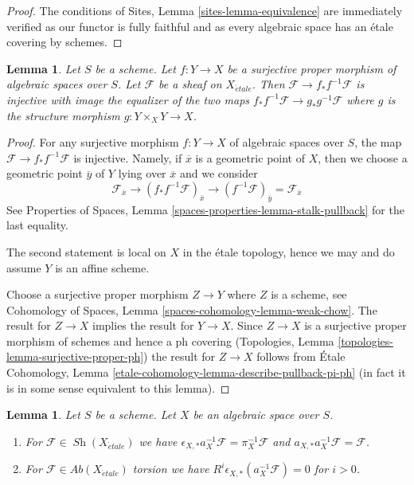 \documentclass{stacks-project}
\theoremstyle{plain}
\newtheorem{lemma}[subsection]{Lemma}
\theoremstyle{definition}
\theoremstyle{remark}
\numberwithin{equation}{subsection}
\def\Sh{\mathop{\mathit{Sh}}\nolimits}
\def\etale{{\acute{e}tale}}
\begin{document}
\begin{proof}
The conditions of Sites, Lemma \ref{sites-lemma-equivalence}
are immediately verified as our functor is fully faithful
and as every algebraic space has an \'etale covering by schemes.
\end{proof}

\begin{lemma}
\label{lemma-surjective-proper}
Let $S$ be a scheme. Let $f : Y \to X$ be a surjective proper morphism
of algebraic spaces over $S$. Let $\mathcal{F}$ be a sheaf on $X_\etale$.
Then $\mathcal{F} \to f_*f^{-1}\mathcal{F}$ is injective with
image the equalizer of the two maps
$f_*f^{-1}\mathcal{F} \to g_*g^{-1}\mathcal{F}$ where
$g$ is the structure morphism $g : Y \times_X Y \to X$.
\end{lemma}

\begin{proof}
For any surjective morphism $f : Y \to X$ of algebraic spaces over $S$,
the map $\mathcal{F} \to f_*f^{-1}\mathcal{F}$ is injective.
Namely, if $\overline{x}$ is a geometric point of $X$, then we
choose a geometric point $\overline{y}$ of $Y$ lying over $\overline{x}$
and we consider
$$
\mathcal{F}_{\overline{x}} \to
(f_*f^{-1}\mathcal{F})_{\overline{x}} \to
(f^{-1}\mathcal{F})_{\overline{y}} = \mathcal{F}_{\overline{x}}
$$
See Properties of Spaces, Lemma \ref{spaces-properties-lemma-stalk-pullback}
for the last equality.

\medskip\noindent
The second statement is local on $X$ in the \'etale topology, hence we may
and do assume $Y$ is an affine scheme.

\medskip\noindent
Choose a surjective proper morphism $Z \to Y$ where $Z$ is a scheme, see
Cohomology of Spaces, Lemma \ref{spaces-cohomology-lemma-weak-chow}.
The result for $Z \to X$ implies the result for $Y \to X$.
Since $Z \to X$ is a surjective proper morphism of schemes
and hence a ph covering
(Topologies, Lemma \ref{topologies-lemma-surjective-proper-ph})
the result for $Z \to X$ follows from
\'Etale Cohomology, Lemma \ref{etale-cohomology-lemma-describe-pullback-pi-ph}
(in fact it is in some sense equivalent to this lemma).
\end{proof}

\begin{lemma}
\label{lemma-comparison-ph-etale}
Let $S$ be a scheme. Let $X$ be an algebraic space over $S$.
\begin{enumerate}
\item For $\mathcal{F} \in \Sh(X_\etale)$ we have
$\epsilon_{X, *}a_X^{-1}\mathcal{F} = \pi_X^{-1}\mathcal{F}$
and $a_{X, *}a_X^{-1}\mathcal{F} = \mathcal{F}$.
\item For $\mathcal{F} \in \textit{Ab}(X_\etale)$ torsion we have
$R^i\epsilon_{X, *}(a_X^{-1}\mathcal{F}) = 0$ for $i > 0$.
\end{enumerate}
\end{lemma}
\end{document}
